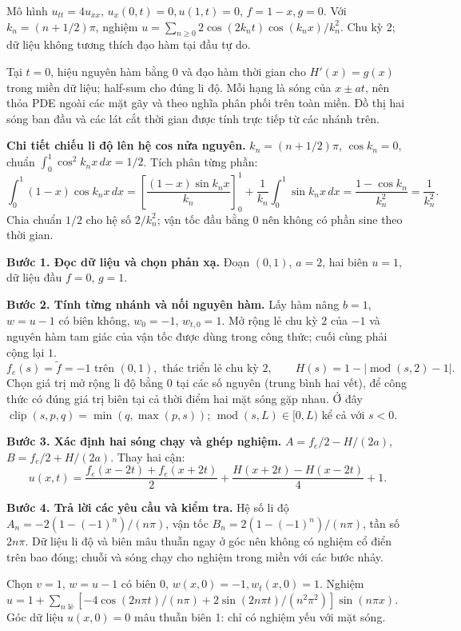 Mô hình $u_{tt}=4u_{xx}$, $u_x(0,t)=0,u(1,t)=0$, $f=1-x,g=0$. Với $k_n=(n+1/2)\pi$, nghiệm $u=\sum_{n\ge0}2\cos(2k_nt)\cos(k_nx)/k_n^2$. Chu kỳ 2; dữ liệu không tương thích đạo hàm tại đầu tự do.

Tại $t=0$, hiệu nguyên hàm bằng $0$ và đạo hàm thời gian cho $H'(x)=g(x)$ trong miền dữ liệu; half-sum cho đúng li độ. Mỗi hạng là sóng của $x\pm at$, nên thỏa PDE ngoài các mặt gãy và theo nghĩa phân phối trên toàn miền. Đồ thị hai sóng ban đầu và các lát cắt thời gian được tính trực tiếp từ các nhánh trên.

\textbf{Chi tiết chiếu li độ lên hệ cos nửa nguyên.} $k_n=(n+1/2)\pi$, $\cos k_n=0$, chuẩn $\int_0^1\cos^2k_nx\,dx=1/2$. Tích phân từng phần:
\[\int_0^1(1-x)\cos k_nx\,dx=\left[\frac{(1-x)\sin k_nx}{k_n}\right]_0^1+\frac1{k_n}\int_0^1\sin k_nx\,dx
=\frac{1-\cos k_n}{k_n^2}=\frac1{k_n^2}.\]
Chia chuẩn $1/2$ cho hệ số $2/k_n^2$; vận tốc đầu bằng $0$ nên không có phần sine theo thời gian.

\textbf{Bước 1. Đọc dữ liệu và chọn phản xạ.} Đoạn $(0,1)$, $a=2$, hai biên $u=1$, dữ liệu đầu $f=0$, $g=1$.

\textbf{Bước 2. Tính từng nhánh và nối nguyên hàm.} Lấy hàm nâng $b=1$, $w=u-1$ có biên không, $w_0=-1$, $w_{t,0}=1$. Mở rộng lẻ chu kỳ $2$ của $-1$ và nguyên hàm tam giác của vận tốc được dùng trong công thức; cuối cùng phải cộng lại $1$.
\[f_e(s)=\widetilde f=-1\text{ trên }(0,1),\text{ thác triển lẻ chu kỳ }2,\qquad H(s)=1-|\operatorname{mod}(s,2)-1|.\]
Chọn giá trị mở rộng li độ bằng $0$ tại các số nguyên (trung bình hai vết), để công thức có đúng giá trị biên tại cả thời điểm hai mặt sóng gặp nhau.
Ở đây $\operatorname{clip}(s,p,q)=\min(q,\max(p,s))$; $\operatorname{mod}(s,L)\in[0,L)$ kể cả với $s<0$.

\textbf{Bước 3. Xác định hai sóng chạy và ghép nghiệm.} $A=f_e/2-H/(2a)$, $B=f_e/2+H/(2a)$. Thay hai cận:
\[u(x,t)=\frac{f_e(x-2t)+f_e(x+2t)}2+\frac{H(x+2t)-H(x-2t)}{4}+1.\]

\textbf{Bước 4. Trả lời các yêu cầu và kiểm tra.} Hệ số li độ $A_n=-2(1-(-1)^n)/(n\pi)$, vận tốc $B_n=2(1-(-1)^n)/(n\pi)$, tần số $2n\pi$. Dữ liệu li độ và biên mâu thuẫn ngay ở góc nên không có nghiệm cổ điển trên bao đóng; chuỗi và sóng chạy cho nghiệm trong miền với các bước nhảy.

Chọn $v=1$, $w=u-1$ có biên 0, $w(x,0)=-1,w_t(x,0)=1$. Nghiệm $u=1+\sum_{n\text{ lẻ}}[-4\cos(2n\pi t)/(n\pi)+2\sin(2n\pi t)/(n^2\pi^2)]\sin(n\pi x)$. Góc dữ liệu $u(x,0)=0$ mâu thuẫn biên 1: chỉ có nghiệm yếu với mặt sóng.

